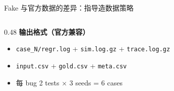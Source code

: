 \documentclass[aspectratio=169,UTF8]{ctexbeamer}
\begin{document}
\begin{frame}{Fake 与官方数据的差异：指导造数据策略}
\begin{columns}[T]
\begin{column}{0.48\textwidth}
      \vspace{3mm}
      \textbf{输出格式（官方兼容）}
      \begin{itemize}
        \item \texttt{case\_N/regr.log} + \texttt{sim.log.gz} + \texttt{trace.log.gz}
        \item \texttt{input.csv} + \texttt{gold.csv} + \texttt{meta.csv}
        \item 每 bug 2 tests $\times$ 3 seeds = 6 cases
      \end{itemize}
    \end{column}
  \end{columns}
\end{frame}

\end{document}
